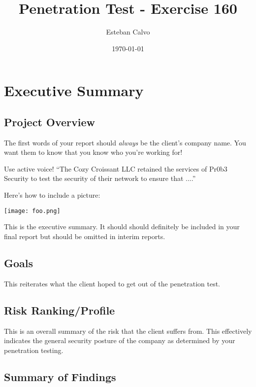 \documentclass[notitlepage]{article}
\begin{document}
  
\title{Penetration Test - Exercise 160}
\author{Esteban Calvo}
\date{\isodate\today}

\maketitle

\tableofcontents

\newpage
\section{Executive Summary}



\subsection{Project Overview}
The first words of your report should \emph{always} be the client's company name.
You want them to know that you know who you're working for!

Use active voice!
``The Cozy Croissant LLC retained the services of Pr0b3 Security to test the security of their network to ensure that ....''

Here's how to include a picture:

\texttt{[image: foo.png]}

This is the executive summary.
It should should definitely be included in your final report but should be omitted in interim reports.


\subsection{Goals}

This reiterates what the client hoped to get out of the penetration
test.

\subsection{Risk Ranking/Profile}

This is an overall summary of the risk that the client suffers from. This effectively indicates the general security posture of the company as determined by your penetration testing.

\subsection{Summary of Findings}
\end{document}
